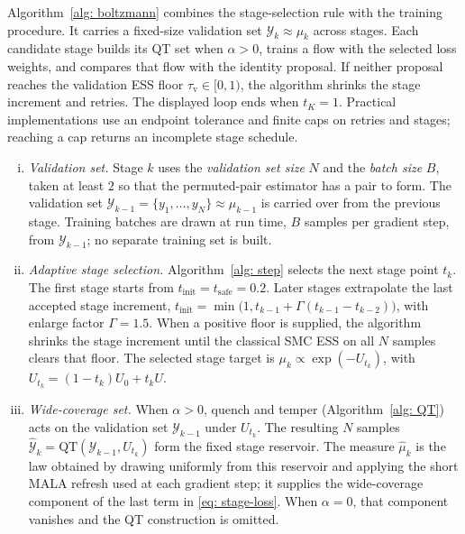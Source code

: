 \documentclass{article}
\begin{document}
Algorithm~\ref{alg: boltzmann} combines the stage-selection rule with the training procedure. It carries a fixed-size validation set $\mathcal Y_k\approx\mu_k$ across stages. Each candidate stage builds its QT set when $\alpha>0$, trains a flow with the selected loss weights, and compares that flow with the identity proposal. If neither proposal reaches the validation ESS floor $\tau_{\mathrm v}\in[0,1)$, the algorithm shrinks the stage increment and retries. The displayed loop ends when $t_K=1$. Practical implementations use an endpoint tolerance and finite caps on retries and stages; reaching a cap returns an incomplete stage schedule.

\begin{enumerate}[(i)]
\item \emph{Validation set.} Stage $k$ uses the \emph{validation set size} $N$ and the \emph{batch size} $B$, taken at least $2$ so that the permuted-pair estimator has a pair to form. The validation set $\mathcal Y_{k-1}=\{y_1,\dots,y_N\}\approx\mu_{k-1}$ is carried over from the previous stage. Training batches are drawn at run time, $B$ samples per gradient step, from $\mathcal Y_{k-1}$; no separate training set is built.

\item \emph{Adaptive stage selection.} Algorithm~\ref{alg: step} selects the next stage point $t_k$. The first stage starts from $t_{\mathrm{init}}=t_{\mathrm{safe}}=0.2$. Later stages extrapolate the last accepted stage increment, $t_{\mathrm{init}}=\min\bigl(1,t_{k-1}+\Gamma(t_{k-1}-t_{k-2})\bigr)$, with enlarge factor $\Gamma=1.5$. When a positive floor is supplied, the algorithm shrinks the stage increment until the classical SMC ESS on all $N$ samples clears that floor. The selected stage target is $\mu_k\propto\exp(-U_{t_k})$, with $U_{t_k}=(1-t_k)U_0+t_kU$.

\item \emph{Wide-coverage set.} When $\alpha>0$, quench and temper (Algorithm~\ref{alg: QT}) acts on the validation set $\mathcal Y_{k-1}$ under $U_{t_k}$. The resulting $N$ samples $\hat{\mathcal Y}_k=\mathrm{QT}(\mathcal Y_{k-1},U_{t_k})$ form the fixed stage reservoir. The measure $\hat\mu_k$ is the law obtained by drawing uniformly from this reservoir and applying the short MALA refresh used at each gradient step; it supplies the wide-coverage component of the last term in \eqref{eq: stage-loss}. When $\alpha=0$, that component vanishes and the QT construction is omitted.


\end{enumerate}
\end{document}
